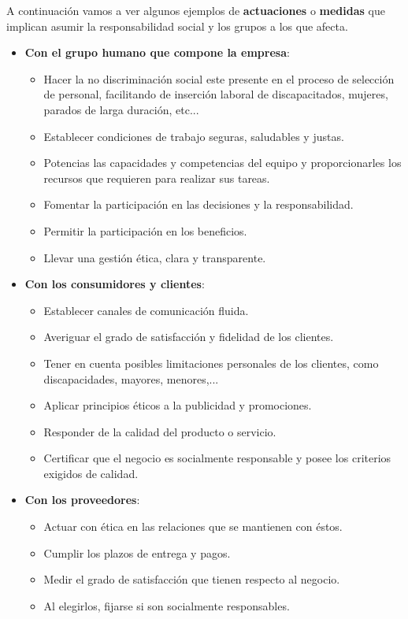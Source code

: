A continuación vamos a ver algunos ejemplos de \textbf{actuaciones} o \textbf{medidas} que implican asumir la responsabilidad social y los grupos a los que afecta.

\begin{itemize}
    \item \textbf{Con el grupo humano que compone la empresa}:
    \begin{itemize}
        \item Hacer la no discriminación social este presente en el proceso de selección de personal, facilitando de inserción laboral de discapacitados, mujeres, parados de larga duración, etc...
        \item Establecer condiciones de trabajo seguras, saludables y justas.
        \item Potencias las capacidades y competencias del equipo y proporcionarles los recursos que requieren para realizar sus tareas.
        \item Fomentar la participación en las decisiones y la responsabilidad.
        \item Permitir la participación en los beneficios.
        \item Llevar una gestión ética, clara y transparente.
    \end{itemize}

    \item \textbf{Con los consumidores y clientes}:
    \begin{itemize}
        \item Establecer canales de comunicación fluida.
        \item Averiguar el grado de satisfacción y fidelidad de los clientes.
        \item Tener en cuenta posibles limitaciones personales de los clientes, como discapacidades, mayores, menores,...
        \item Aplicar principios éticos a la publicidad y promociones.
        \item Responder de la calidad del producto o servicio.
        \item Certificar que el negocio es socialmente responsable y posee los criterios exigidos de calidad.
    \end{itemize}

    \item \textbf{Con los proveedores}:
    \begin{itemize}
        \item Actuar con ética en las relaciones que se mantienen con éstos.
        \item Cumplir los plazos de entrega y pagos.
        \item Medir el grado de satisfacción que tienen respecto al negocio.
        \item Al elegirlos, fijarse si son socialmente responsables.
    \end{itemize}


\end{itemize}
